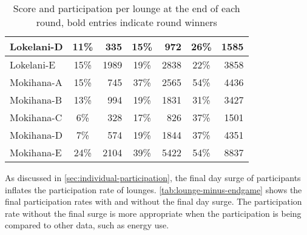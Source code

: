 \begin{table}[htbp]
\begin{tabular}{| l | c | r | c | r | c | r |}
			Lokelani-D & 11\% & 335 & 15\% & 972 & 26\% & 1585 \\ \hline
			Lokelani-E & 15\% & 1989 & 19\% & 2838 & 22\% & 3858 \\ \hline
			Mokihana-A & 15\% & 745 & 37\% & 2565 & 54\% & 4436 \\ \hline
			Mokihana-B & 13\% & 994 & 19\% & 1831 & 31\% & 3427 \\ \hline
			Mokihana-C & 6\% & 328 & 17\% & 826 & 37\% & 1501 \\ \hline
			Mokihana-D & 7\% & 574 & 19\% & 1844 & 37\% & 4351 \\ \hline
			Mokihana-E & 24\% & 2104 & 39\% & 5422 & 54\% & 8837 \\ \hline
		\end{tabular}
	\caption[Score and participation per lounge at the end of each round]{Score and participation per lounge at the end of each round, bold entries indicate round winners}
\label{tab:lounge-participation}
\end{table}

As discussed in \autoref{sec:individual-participation}, the final day surge of participants inflates the participation rate of lounges. \autoref{tab:lounge-minus-endgame} shows the final participation rates with and without the final day surge. The participation rate without the final surge is more appropriate when the participation is being compared to other data, such as energy use.

